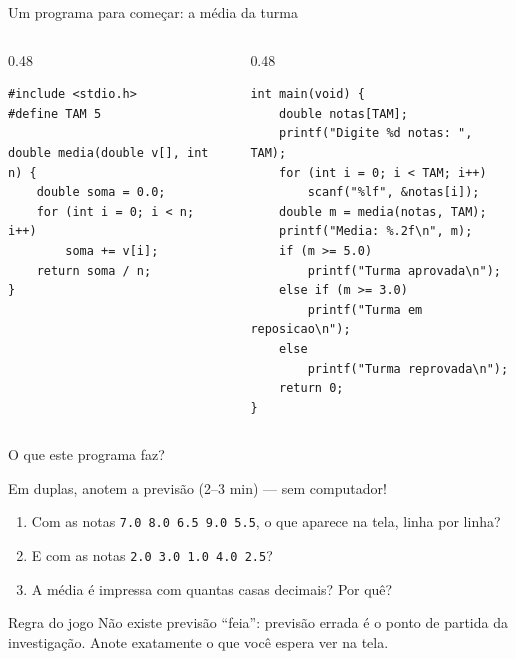 \documentclass[aspectratio=169]{beamer}
\begin{document}
\begin{frame}[fragile]{Um programa para começar: a média da turma}
\begin{columns}[T]
\begin{column}{0.48\textwidth}
\begin{lstlisting}[basicstyle=\ttfamily\scriptsize]
#include <stdio.h>
#define TAM 5

double media(double v[], int n) {
    double soma = 0.0;
    for (int i = 0; i < n; i++)
        soma += v[i];
    return soma / n;
}
\end{lstlisting}
\end{column}
\begin{column}{0.48\textwidth}
\begin{lstlisting}[basicstyle=\ttfamily\scriptsize, firstnumber=10]
int main(void) {
    double notas[TAM];
    printf("Digite %d notas: ", TAM);
    for (int i = 0; i < TAM; i++)
        scanf("%lf", &notas[i]);
    double m = media(notas, TAM);
    printf("Media: %.2f\n", m);
    if (m >= 5.0)
        printf("Turma aprovada\n");
    else if (m >= 3.0)
        printf("Turma em reposicao\n");
    else
        printf("Turma reprovada\n");
    return 0;
}
\end{lstlisting}
\end{column}
\end{columns}
\end{frame}

\begin{frame}{O que este programa faz?}
  \begin{block}{Em duplas, anotem a previsão (2--3 min) --- sem computador!}
    \begin{enumerate}
      \item Com as notas \texttt{7.0 8.0 6.5 9.0 5.5}, o que aparece na tela,
        linha por linha?
      \item E com as notas \texttt{2.0 3.0 1.0 4.0 2.5}?
      \item A média é impressa com quantas casas decimais? Por quê?
    \end{enumerate}
  \end{block}
  \begin{exampleblock}{Regra do jogo}
    Não existe previsão ``feia'': previsão errada é o ponto de partida da
    investigação. Anote exatamente o que você espera ver na tela.
  \end{exampleblock}
\end{frame}
\end{document}
